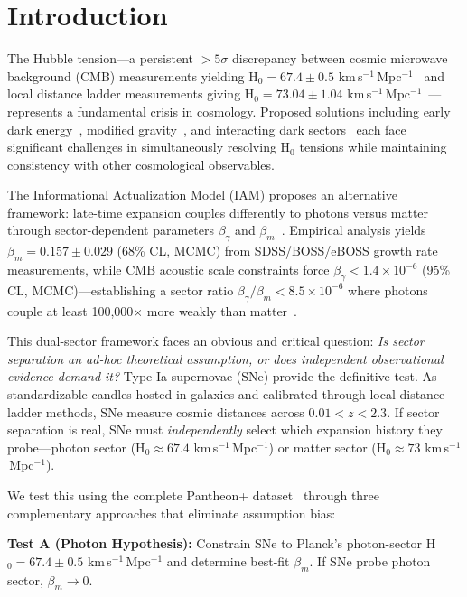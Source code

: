 \documentclass[twocolumn,superscriptaddress,prd,amsmath,amssymb]{revtex4-2}
\begin{document}
\section{Introduction}

The Hubble tension---a persistent $>5\sigma$ discrepancy between cosmic microwave background (CMB) measurements yielding H$_0 = 67.4 \pm 0.5$ km\,s$^{-1}$\,Mpc$^{-1}$~\cite{PlanckCollaboration2020} and local distance ladder measurements giving H$_0 = 73.04 \pm 1.04$ km\,s$^{-1}$\,Mpc$^{-1}$~\cite{Riess2022}---represents a fundamental crisis in cosmology. Proposed solutions including early dark energy~\cite{Kamionkowski2023}, modified gravity~\cite{Amendola2020}, and interacting dark sectors~\cite{DiValentino2021} each face significant challenges in simultaneously resolving H$_0$ tensions while maintaining consistency with other cosmological observables.

The Informational Actualization Model (IAM) proposes an alternative framework: late-time expansion couples differently to photons versus matter through sector-dependent parameters $\beta_\gamma$ and $\beta_m$~\cite{IAMManuscript2025}. Empirical analysis yields $\beta_m = 0.157 \pm 0.029$ (68\% CL, MCMC) from SDSS/BOSS/eBOSS growth rate measurements, while CMB acoustic scale constraints force $\beta_\gamma < 1.4 \times 10^{-6}$ (95\% CL, MCMC)---establishing a sector ratio $\beta_\gamma/\beta_m < 8.5 \times 10^{-6}$ where photons couple at least 100,000$\times$ more weakly than matter~\cite{IAMCompendium2025}.

This dual-sector framework faces an obvious and critical question: \textit{Is sector separation an ad-hoc theoretical assumption, or does independent observational evidence demand it?} Type Ia supernovae (SNe) provide the definitive test. As standardizable candles hosted in galaxies and calibrated through local distance ladder methods, SNe measure cosmic distances across $0.01 < z < 2.3$. If sector separation is real, SNe must \textit{independently} select which expansion history they probe---photon sector (H$_0 \approx 67.4$ km\,s$^{-1}$\,Mpc$^{-1}$) or matter sector (H$_0 \approx 73$ km\,s$^{-1}$\,Mpc$^{-1}$).

We test this using the complete Pantheon+ dataset~\cite{Brout2022} through three complementary approaches that eliminate assumption bias:

\textbf{Test A (Photon Hypothesis):} Constrain SNe to Planck's photon-sector H$_0 = 67.4 \pm 0.5$ km\,s$^{-1}$\,Mpc$^{-1}$ and determine best-fit $\beta_m$. If SNe probe photon sector, $\beta_m \to 0$.
\end{document}
